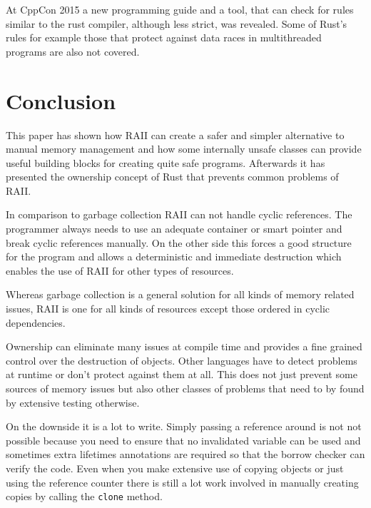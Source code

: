\documentclass[conference,twocolumn]{IEEEtran}
\begin{document}
At CppCon 2015 a new programming guide and a tool, that can check for rules similar to the rust compiler, although less strict, was revealed. Some of Rust's rules for example those that protect against data races in multithreaded programs are also not covered.


\section{Conclusion}

This paper has shown how RAII can create a safer and simpler alternative to manual memory management and how some internally unsafe classes can provide useful building blocks for creating quite safe programs. Afterwards it has presented the ownership concept of Rust that prevents common problems of RAII.

In comparison to garbage collection RAII can not handle cyclic references. The programmer always needs to use an adequate container or smart pointer and break cyclic references manually. On the other side this forces a good structure for the program and allows a deterministic and immediate destruction which enables the use of RAII for other types of resources. 

Whereas garbage collection is a general solution for all kinds of memory related issues, RAII is one for all kinds of resources except those ordered in cyclic dependencies.

Ownership can eliminate many issues at compile time and provides a fine grained control over the destruction of objects.
Other languages have to detect problems at runtime or don't protect against them at all. This does not just prevent some sources of memory issues but also other classes of problems that need to by found by extensive testing otherwise.

On the downside it is a lot to write. Simply passing a reference around is not not possible because you need to ensure that no invalidated variable can be used and sometimes extra lifetimes annotations are required so that the borrow checker can verify the code. Even when you make extensive use of copying objects or just using the reference counter there is still a lot work involved in manually creating copies by calling the \verb|clone| method.
\end{document}
